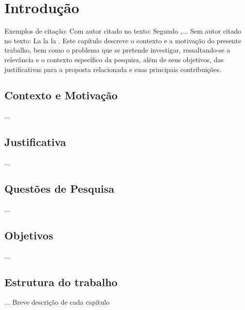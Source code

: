 \chapter{Introdução} \label{cha:introducao}
Exemplos de citação:
Com autor citado no texto: Segundo ,...
Sem autor citado no texto: La la la \cite{wazlawick2017metodologia}.
Este capítulo descreve o contexto e a motivação do presente trabalho, bem como o problema que se pretende investigar, ressaltando-se a relevância e o contexto específico da pesquisa, além de seus objetivos, das justificativas para a proposta relacionada e suas principais contribuições.

\section{Contexto e Motivação}
...

\section{Justificativa}
...

\section{Questões de Pesquisa}
...

\section{Objetivos}
...

\section{Estrutura do trabalho}
... Breve descrição de cada capítulo

